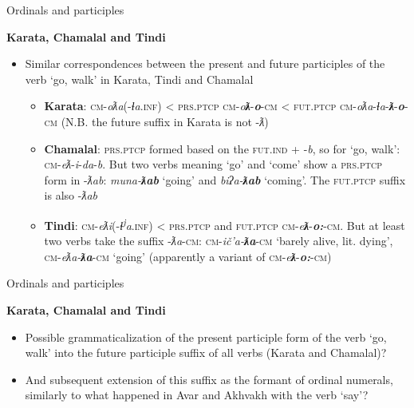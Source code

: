 \begin{frame}{Ordinals and participles}
\begin{center}
    \textbf{Karata, Chamalal and Tindi}
\end{center}
\begin{itemize}
    \item Similar correspondences between the present and future participles of the verb `go, walk' in Karata, Tindi and Chamalal 
    \begin{itemize}
        \item \textbf{Karata}: \textsc{cm}-\textit{oƛa}(-\textit{ɬa}.\textsc{inf}) < \textsc{prs.ptcp} \textsc{cm}-\textit{o\textbf{ƛ}}-\textit{\textbf{o}}-\textsc{cm} < \textsc{fut.ptcp} \textsc{cm}-\textit{oƛa}-\textit{ɬa}-\textit{\textbf{ƛ}}-\textit{\textbf{o}}-\textsc{cm} (N.B. the future suffix in Karata is not -\textit{ƛ})
        \pause
        \item \textbf{Chamalal}: \textsc{prs.ptcp} formed based on the \textsc{fut.ind} + -\textit{b}, so for `go, walk': \textsc{cm}-\textit{eƛ}-\textit{i}-\textit{da}-\textit{b}. But two verbs meaning `go' and `come' show a \textsc{prs.ptcp} form in -\textit{ƛab}: \textit{muna-\textbf{ƛab}} `going' and \textit{biʔa-\textbf{ƛab}} `coming'. The \textsc{fut.ptcp} suffix is also -\textit{ƛab} 
        \pause
        \item \textbf{Tindi}: \textsc{cm}-\textit{eƛi}(-\textit{ɬ}\textsuperscript{\textit{j}}\textit{a}.\textsc{inf}) < \textsc{prs.ptcp} and \textsc{fut.ptcp} \textsc{cm}-\textit{e\textbf{ƛ}}-\textit{\textbf{o:}}-\textsc{cm}. But at least two verbs take the suffix -\textit{ƛa}-\textsc{cm}: \textsc{cm}-\textit{ič'a-\textbf{ƛa}}-\textsc{cm} `barely alive, lit. dying', \textsc{cm}-\textit{eƛa-\textbf{ƛa}}-\textsc{cm} `going' (apparently a variant of \textsc{cm}-\textit{e\textbf{ƛ}}-\textit{\textbf{o:}}-\textsc{cm})
    \end{itemize}
\end{itemize}
    
\end{frame}

\begin{frame}{Ordinals and participles}
\begin{center}
    \textbf{Karata, Chamalal and Tindi}
\end{center}
\begin{itemize}
    \item Possible grammaticalization of the present participle form of the verb `go, walk' into the future participle suffix of all verbs (Karata and Chamalal)?
    \item And subsequent extension of this suffix as the formant of ordinal numerals, similarly to what happened in Avar and Akhvakh with the verb `say'?
\end{itemize}
    
\end{frame}

